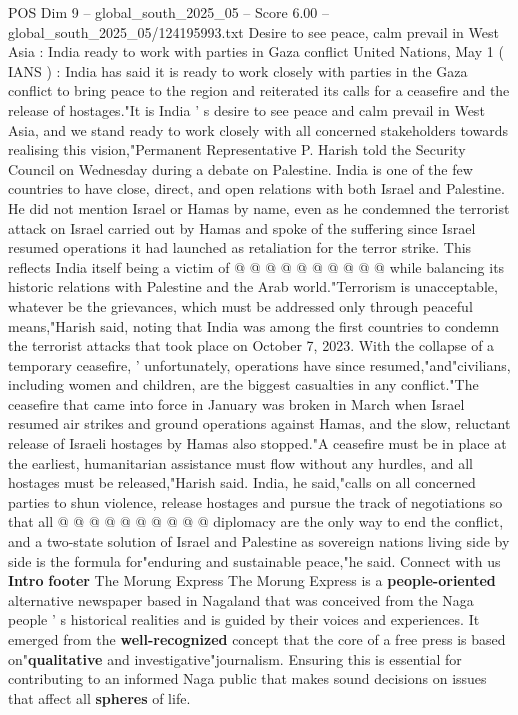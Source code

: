 \begin{textsample}{POS Dim 9 – global\_south\_2025\_05 – Score 6.00 – global\_south\_2025\_05/124195993.txt}  \label{ex:f9_pos_202}
Desire to see peace, calm prevail in West Asia : India ready to work with parties in Gaza conflict United Nations, May 1 ( IANS ) : India has said it is ready to work closely with parties in the Gaza conflict to bring peace to the region and reiterated its calls for a ceasefire and the release of hostages."It is India ' s desire to see peace and calm prevail in West Asia, and we stand ready to work closely with all concerned stakeholders towards realising this vision,"Permanent Representative P.
Harish told the Security Council on Wednesday during a debate on Palestine.
India is one of the few countries to have close, direct, and open relations with both Israel and Palestine.
He did not mention Israel or Hamas by name, even as he condemned the terrorist attack on Israel carried out by Hamas and spoke of the suffering since Israel resumed operations it had launched as retaliation for the terror strike.
This reflects India itself being a victim of @ @ @ @ @ @ @ @ @ @ while balancing its historic relations with Palestine and the Arab world."Terrorism is unacceptable, whatever be the grievances, which must be addressed only through peaceful means,"Harish said, noting that India was among the first countries to condemn the terrorist attacks that took place on October 7, 2023.
With the collapse of a temporary ceasefire, ' unfortunately, operations have since resumed,"and"civilians, including women and children, are the biggest casualties in any conflict."The ceasefire that came into force in January was broken in March when Israel resumed air strikes and ground operations against Hamas, and the slow, reluctant release of Israeli hostages by Hamas also stopped."A ceasefire must be in place at the earliest, humanitarian assistance must flow without any hurdles, and all hostages must be released,"Harish said.
India, he said,"calls on all concerned parties to shun violence, release hostages and pursue the track of negotiations so that all @ @ @ @ @ @ @ @ @ @ diplomacy are the only way to end the conflict, and a two-state solution of Israel and Palestine as sovereign nations living side by side is the formula for"enduring and sustainable peace,"he said.
Connect with us \textbf{Intro} \textbf{footer} The Morung Express The Morung Express is a \textbf{people-oriented} alternative newspaper based in Nagaland that was conceived from the Naga people ' s historical realities and is guided by their voices and experiences.
It emerged from the \textbf{well-recognized} concept that the core of a free press is based on"\textbf{qualitative} and investigative"journalism.
Ensuring this is essential for contributing to an informed Naga public that makes sound decisions on issues that affect all \textbf{spheres} of life.

\end{textsample}

